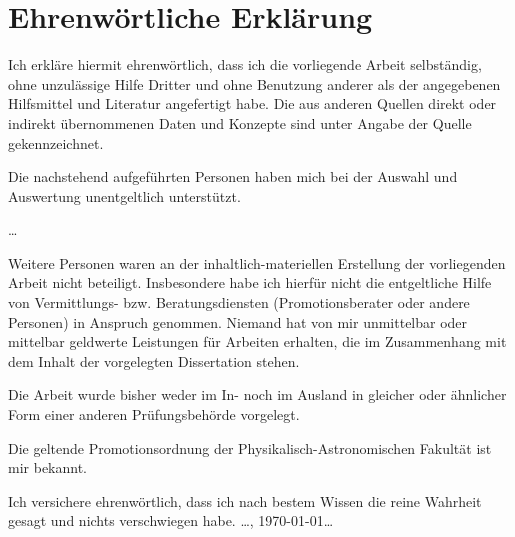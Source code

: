 \chapter{Ehrenwörtliche Erklärung}

Ich erkläre hiermit ehrenwörtlich, dass ich die vorliegende Arbeit selbständig, ohne unzulässige Hilfe Dritter und ohne Benutzung anderer als der angegebenen Hilfsmittel und Literatur angefertigt habe. Die aus anderen Quellen direkt oder indirekt übernommenen Daten und Konzepte sind unter Angabe der Quelle gekennzeichnet.

Die nachstehend aufgeführten Personen haben mich bei der Auswahl und Auswertung unentgeltlich unterstützt.

\ldots

Weitere Personen waren an der inhaltlich-materiellen Erstellung der vorliegenden Arbeit
nicht beteiligt. Insbesondere habe ich hierfür nicht die entgeltliche Hilfe von Vermittlungs- bzw. Beratungsdiensten (Promotionsberater oder andere Personen) in Anspruch genommen. Niemand hat von mir unmittelbar oder mittelbar geldwerte Leistungen für Arbeiten erhalten, die im Zusammenhang mit dem Inhalt der vorgelegten Dissertation stehen.

Die Arbeit wurde bisher weder im In- noch im Ausland in gleicher oder ähnlicher Form einer anderen Prüfungsbehörde vorgelegt.

Die geltende Promotionsordnung der Physikalisch-Astronomischen Fakultät ist mir bekannt.

Ich versichere ehrenwörtlich, dass ich nach bestem Wissen die reine Wahrheit gesagt und nichts verschwiegen habe.
\vfill
\ldots, \today \hfill \ldots\\
